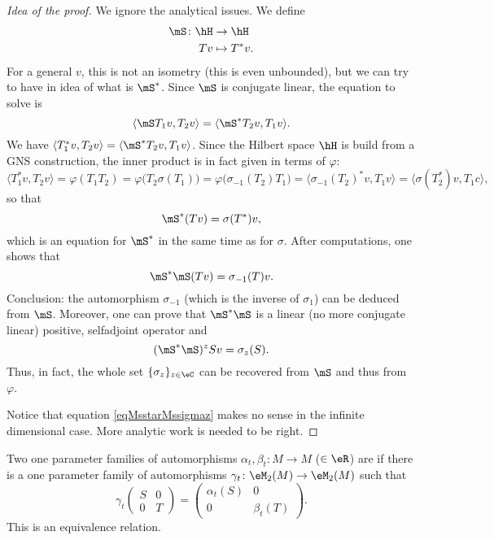 \begin{proof}[Idea of the proof]
	We ignore the analytical issues.  We define
	\begin{equation}
		\begin{aligned}
			\mS\colon \hH & \to \hH       \\
			Tv            & \mapsto T^*v.
		\end{aligned}
	\end{equation}
	For a general $v$, this is not an isometry (this is even unbounded), but we can try to have in idea of what is $\mS^*$. Since $\mS$ is conjugate linear, the equation to solve is
	\begin{equation}
		\langle \mS T_1v, T_2v\rangle =\langle \mS^*T_2v, T_1v\rangle .
	\end{equation}
	We have $\langle T_1^*v, T_2v\rangle =\langle \mS^*T_2v, T_1v\rangle $. Since the Hilbert space $\hH$ is build from a GNS construction, the inner product is in fact given in terms of $\varphi$:
	\begin{equation}
		\langle T_1^*v, T_2v\rangle =\varphi(T_1T_2)=\varphi\big( T_2\sigma(T_1) \big)=\varphi\big( \sigma_{-1}(T_2)T_1 \big)=\langle \sigma_{-1}(T_2)^*v, T_1v\rangle =\langle \sigma(T_2^*)v, T_1c\rangle,
	\end{equation}
	so that
	\begin{equation}
		\mS^*(Tv)=\sigma(T^*)v,
	\end{equation}
	which is an equation for $\mS^*$ in the same time as for $\sigma$. After computations, one shows that
	\begin{equation}
		\mS^*\mS(Tv)=\sigma_{-1}(T)v.
	\end{equation}
	Conclusion: the automorphism $\sigma_{-1}$ (which is the inverse of $\sigma_1$) can be deduced from $\mS$. Moreover, one can prove that $\mS^*\mS$ is a linear (no more conjugate linear) positive, selfadjoint operator and
	\begin{equation}		\label{eqMsstarMssigmaz}
		(\mS^*\mS)^zSv=\sigma_z(S).
	\end{equation}
	Thus, in fact, the whole set $\{ \sigma_z \}_{z\in\eC}$ can be recovered from $\mS$ and thus from $\varphi$.

	Notice that equation \eqref{eqMsstarMssigmaz} makes no sense in the infinite dimensional case. More analytic work is needed to be right.

\end{proof}

Two one parameter families of automorphisms $\alpha_t,\beta_t\colon M\to M$ ($\in \eR$) are  if there is a one parameter family of automorphisms $\gamma_t\colon \eM_2(M)\to \eM_2(M)$ such that
\begin{equation}
	\gamma_t
	\begin{pmatrix}
		S & 0 \\
		0 & T
	\end{pmatrix}
	=
	\begin{pmatrix}
		\alpha_t(S) & 0          \\
		0           & \beta_t(T)
	\end{pmatrix}.
\end{equation}
This is an equivalence relation.

